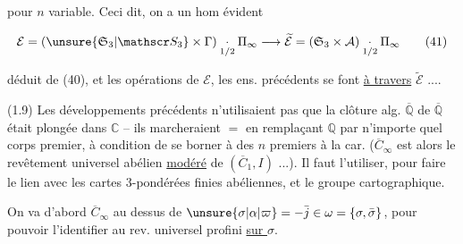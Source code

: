 
pour $n$ variable. Ceci dit, on a un hom évident

\[
\mathcal E=(\unsure{\mathfrak S_3|\mathscr S_3}\times\Gamma)\underset{1/2}{\cdot}\Pi_\infty\longrightarrow
\widetilde{\mathcal E}=(\mathfrak S_3\times\mathcal A)\underset{1/2}{\cdot}\Pi_\infty
\tag*{(41)}
\]

déduit de (40), et les opérations de $\mathcal E$,  les ens. précédents se font \uline{à travers} $\widetilde{\mathcal E}$ ....

(1.9) Les développements précédents n'utilisaient pas que la clôture alg.  $\overline{\mathbb Q}$ de $\overline{\mathbb Q}$ était plongée dans $\mathbb C$ -- ils marcheraient $=$ en remplaçant $\mathbb Q$ par n'importe quel corps premier, à condition de se borner à des $n$ premiers à la car. ($\overline C_\infty$ est alors le revêtement universel abélien \uline{modéré} de $(\overline C_1,I)$ ...). Il faut l'utiliser, pour faire le lien avec les cartes $3$-pondérées finies abéliennes, et le groupe cartographique.

On va d'abord  $\overline C_\infty$ au dessus de $\unsure{\sigma|\alpha|\varpi}=-\bar j\in\omega=\{\sigma,\bar\sigma\}$, pour pouvoir l'identifier au rev. universel profini  \uline{sur $\sigma$}.

